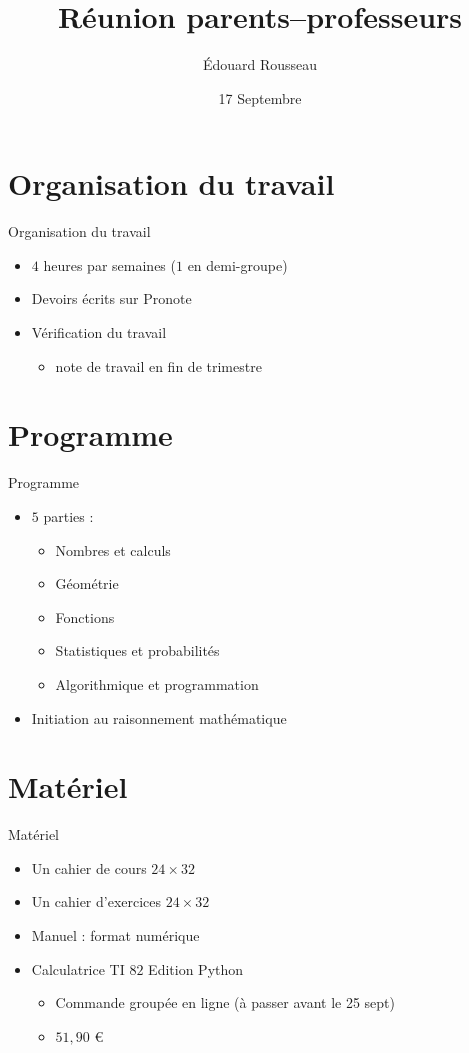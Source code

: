 \documentclass[17pt,xcolor=x11names]{beamer}
\begin{document}
\begin{frame}
  \title{Réunion parents--professeurs}
  \author{Édouard Rousseau }
\date{17 Septembre}
\titlepage
\end{frame}
\section*{Organisation du travail}
\begin{frame}{Organisation du travail}
  \begin{itemize}
    \item $4$ heures par semaines ($1$ en demi-groupe)
    \item Devoirs écrits sur Pronote
    \item Vérification du travail
      \begin{itemize}
        \item note de travail en fin de trimestre
      \end{itemize}
  \end{itemize}
\end{frame}
\section*{Programme}
\begin{frame}{Programme}
  \begin{itemize}
    \item $5$ parties :
      \begin{itemize}
        \item Nombres et calculs
        \item Géométrie
        \item Fonctions
        \item Statistiques et probabilités
        \item Algorithmique et programmation
      \end{itemize}
    \item Initiation au raisonnement mathématique
  \end{itemize}
\end{frame}

\section*{Matériel}
\begin{frame}{Matériel}
  \begin{itemize}
    \item Un cahier de cours $24\times32$
    \item Un cahier d'exercices $24\times32$
    \item Manuel : format numérique
    \item Calculatrice TI $82$ Edition Python \begin{itemize}
        \item Commande groupée en ligne (à passer avant le 25 sept)
        \item $51,90$ €
      \end{itemize}
  \end{itemize}
\end{frame}
\end{document}
